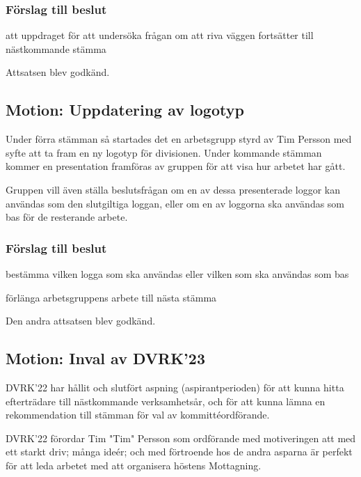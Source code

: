 \documentclass[protokoll]{dvd}
\begin{document}
\subsubsection*{Förslag till beslut}
\begin{attsatser}
    \item att uppdraget för att undersöka frågan om att riva väggen
    fortsätter till nästkommande stämma
\end{attsatser}

Attsatsen blev godkänd.

\subsection*{Motion: Uppdatering av logotyp}
Under förra stämman så startades det en arbetsgrupp styrd av Tim Persson
med syfte att ta fram en ny logotyp för divisionen. Under kommande stämman
kommer en presentation framföras av gruppen för att visa hur arbetet har gått.

Gruppen vill även ställa beslutsfrågan om en av dessa presenterade loggor
kan användas som den slutgiltiga loggan, eller om en av loggorna ska användas som
bas för de resterande arbete.

\subsubsection*{Förslag till beslut}
\begin{attsatser}
    \item bestämma vilken logga som ska användas eller vilken som ska användas som bas
    \item förlänga arbetsgruppens arbete till nästa stämma
\end{attsatser}

Den andra attsatsen blev godkänd.

\subsection{Motion: Inval av DVRK'23}

DVRK'22 har hållit och slutfört aspning (aspirantperioden) för att kunna hitta efterträdare till nästkommande verksamhetsår, och för att kunna lämna en rekommendation till stämman för val av kommittéordförande.

DVRK'22 förordar Tim "Tim" Persson som ordförande med motiveringen att med ett starkt driv; många ideér; och med förtroende hos de andra asparna är perfekt för att leda arbetet med att organisera höstens Mottagning.
\end{document}
